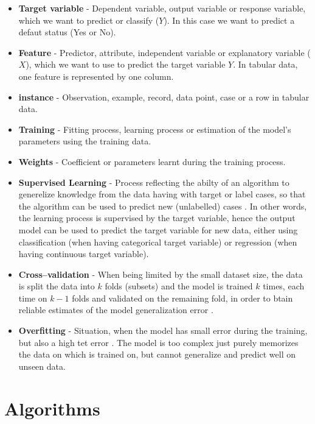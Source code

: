\begin{itemize}\setlength\itemsep{0em}
	\item \textbf{Target variable} - Dependent variable, output variable or response variable, which we want to predict or classify ($Y$). In this case we want to predict a defaut status (Yes or No).
	\item \textbf{Feature} - Predictor, attribute, independent variable or explanatory variable ($X$), which we want to use to predict the target variable $Y$. In tabular data, one feature is represented by one column.
	\item \textbf{instance} - Observation, example, record, data point, case or a row in tabular data.
	\item \textbf{Training} - Fitting process, learning process or estimation of the model's parameters using the training data.
	\item \textbf{Weights} - Coefficient or parameters learnt during the training process.
	\item \textbf{Supervised Learning} - Process reflecting the abilty of an algorithm to generelize knowledge from the data having with target or label cases, so that the algorithm can be used to predict new (unlabelled) cases \citep{alloghani2020supervised}.
    In other words, the learning process is supervised by the target variable, hence the output model can be used to predict the target variable for new data, either using classification (when having categorical target variable) or regression (when having continuous target variable).
	\item \textbf{Cross--validation} - When being limited by the small dataset size, the data is split the data into $k$ folds (subsets) and the model is trained $k$ times, each time on $k-1$ folds and validated on the remaining fold, in order to btain reliable estimates of the model generalization error \citep{tatsat2020machine}.
	\item \textbf{Overfitting} - Situation, when the model has small error during the training, but also a high tet error \citep{forsyth2019applied}. The model is too complex just purely memorizes the data on which is trained on, but cannot generalize and predict well on unseen data.
\end{itemize}

\section{Algorithms}
\label{sec:algorithms}

